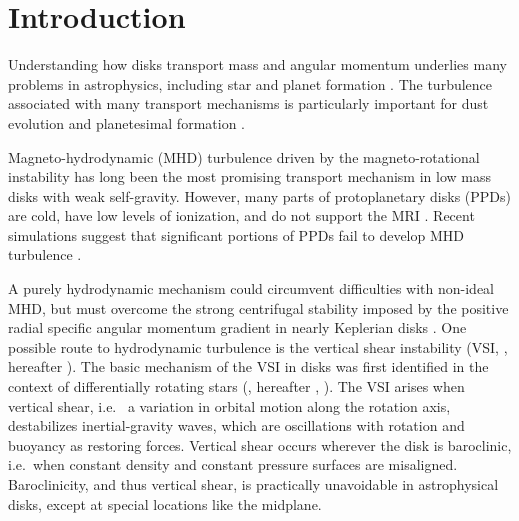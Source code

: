 \documentclass[iop, numberedappendix]{emulateapj}
\begin{document}
\section{Introduction}\label{intro}
Understanding how disks transport mass and angular momentum underlies 
many problems in astrophysics, including star and planet formation  
\citep[][]{lyndenbell74, armitage10}.  The turbulence associated with many transport mechanisms
is particularly important for dust evolution and planetesimal formation \citep{yl07, chiang10}. 

Magneto-hydrodynamic (MHD) turbulence driven by
the magneto-rotational instability \citep[MRI,][]{balbus91} has long been the most
promising transport mechanism in low mass disks with weak self-gravity. 
However, many parts of protoplanetary  
disks (PPDs) are cold, have low levels of ionization, and do not support the MRI 
\citep{blaes94,salmeron03}. Recent simulations
suggest that significant portions of PPDs fail to develop MHD
turbulence \citep[e.g.][]{simon13, lesur14,bai15,gressel15}. 

A purely hydrodynamic mechanism could circumvent difficulties with non-ideal MHD, but must overcome
the strong centrifugal stability imposed by the positive radial specific angular
momentum gradient in nearly Keplerian disks \citep{balbus96}.
One possible route to hydrodynamic turbulence is the vertical shear
instability (VSI, \citealp{urpin98, urpin03, nelson13}, hereafter ).  The
basic mechanism of the VSI  in disks was first 
identified in the context of differentially rotating stars (\citealp{goldreich67}, hereafter , \citealp{fricke68}).   
The VSI arises when vertical shear, i.e. \ a variation in orbital motion along the rotation axis, 
destabilizes inertial-gravity waves, which are oscillations 
with rotation and buoyancy as restoring forces. Vertical shear
occurs wherever the disk is baroclinic, i.e.\ when constant 
density and constant pressure surfaces are misaligned.  Baroclinicity, and thus vertical shear, is 
practically unavoidable in astrophysical disks, except at special locations like the
midplane. 
\end{document}
